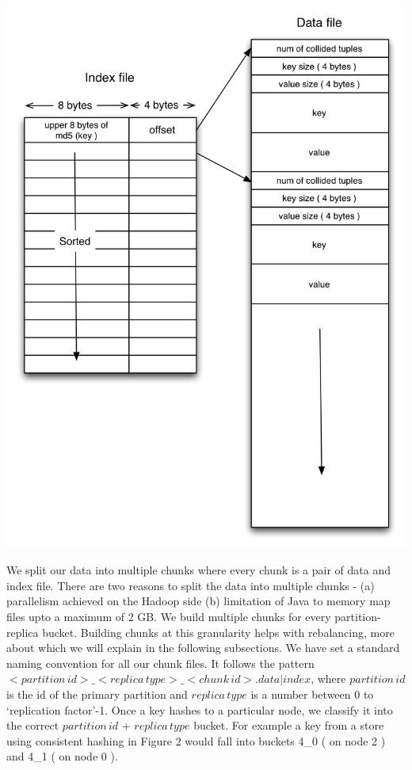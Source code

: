 \documentclass[10pt,twocolumn,preprint,natbib,authoryear]{sigplanconf}
\begin{document}
\begin{center}
\includegraphics[scale=0.50]{storage_format.png}
\end{center}

We split our data into multiple chunks where every chunk is a pair of data and index file. There are two reasons to split the data into multiple chunks - (a) parallelism achieved on the Hadoop side (b) limitation of Java to memory map files upto a maximum of 2 GB. We build multiple chunks for every partition-replica bucket. Building chunks at this granularity helps with rebalancing, more about which we will explain in the following subsections. We have set a standard naming convention for all our chunk files. It follows the pattern $<partition\,id>\_<replica\,type>\_<chunk\,id>.data|index$, where $partition\,id$ is the id of the primary partition and $replica\,type$ is a number between 0 to `replication factor'-1. Once a key hashes to a particular node, we classify it into the correct $partition\,id$ + $replica\,type$ bucket. For example a key from a store using consistent hashing in Figure 2 would fall into buckets 4\_0 ( on node 2 ) and 4\_1 ( on node 0 ). 
\end{document}
